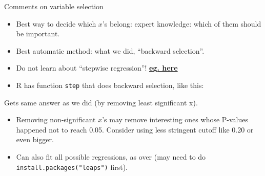 \begin{frame}[fragile]{Comments on variable selection}
\protect\hypertarget{comments-on-variable-selection}{}
\begin{itemize}
\tightlist
\item
  Best way to decide which \(x\)'s belong: expert knowledge: which of
  them should be important.
\item
  Best automatic method: what we did, ``backward selection''.
\item
  Do not learn about ``stepwise regression''!
  \href{https://towardsdatascience.com/stopping-stepwise-why-stepwise-selection-is-bad-and-what-you-should-use-instead-90818b3f52df}{\textbf{eg.
  here}}
\item
  R has function \texttt{step} that does backward selection, like this:
\end{itemize}

\begin{Shaded}
\begin{Highlighting}[]
\NormalTok{, } \NormalTok{, } \NormalTok{)}
\end{Highlighting}
\end{Shaded}

Gets same answer as we did (by removing least significant x).

\begin{itemize}
\tightlist
\item
  Removing non-significant \(x\)'s may remove interesting ones whose
  P-values happened not to reach 0.05. Consider using less stringent
  cutoff like 0.20 or even bigger.
\item
  Can also fit all possible regressions, as over (may need to do
  \texttt{install.packages("leaps")} first).
\end{itemize}
\end{frame}

